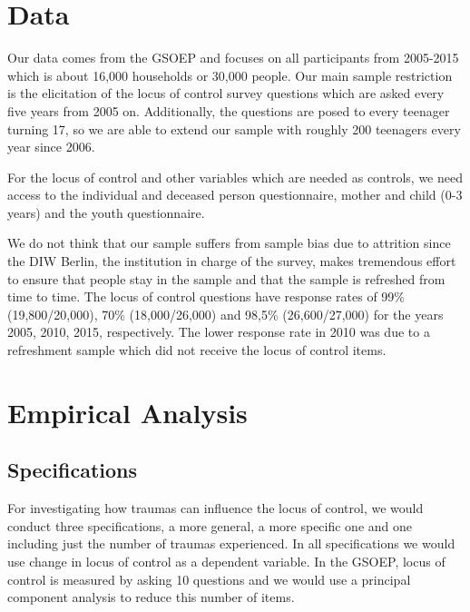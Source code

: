 \documentclass{scrartcl}
\begin{document}

\section{Data} %
\label{sec:data}

Our data comes from the GSOEP and focuses on all participants from 2005-2015
which is about 16,000 households or 30,000 people. Our main sample restriction
is the elicitation of the locus of control survey questions which are asked
every five years from 2005 on. Additionally, the questions are posed to every
teenager turning 17, so we are able to extend our sample with roughly 200
teenagers every year since 2006.

For the locus of control and other variables which are needed as controls, we
need access to the individual and deceased person questionnaire, mother and
child (0-3 years) and the youth questionnaire.

We do not think that our sample suffers from sample bias due to attrition since
the DIW Berlin, the institution in charge of the survey, makes tremendous
effort to ensure that people stay in the sample and that the sample is
refreshed from time to time. The locus of control questions have response rates
of 99\% (19,800/20,000), 70\% (18,000/26,000) and 98,5\% (26,600/27,000) for
the years 2005, 2010, 2015, respectively. The lower response rate in 2010 was
due to a refreshment sample which did not receive the locus of control items.


\section{Empirical Analysis} %
\label{sec:empirical_analysis}

\subsection{Specifications} %
\label{sub:specifications}

For investigating how traumas can influence the locus of control, we would
conduct three specifications, a more general, a more specific one and one
including just the number of traumas experienced. In all specifications we
would use change in locus of control as a dependent variable. In the GSOEP,
locus of control is measured by asking 10 questions and we would use a
principal component analysis to reduce this number of items.
\end{document}
